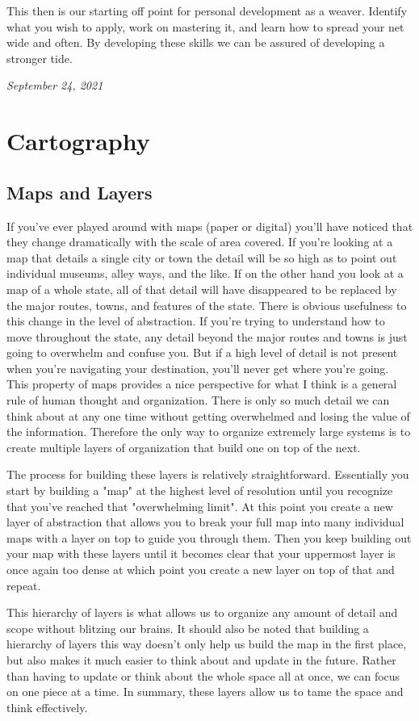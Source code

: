 \documentclass[10pt,a5paper]{book}
\begin{document}
This then is our starting off point for personal development as a weaver. Identify what you wish to apply, work on mastering it, and learn how to spread your net wide and often. By developing these skills we can be assured of developing a stronger tide. 

\textit{September 24, 2021}

\section{Cartography}
\subsection{Maps and Layers}
If you've ever played around with maps (paper or digital) you'll have noticed that they change dramatically with the scale of area covered. If you're looking at a map that details a single city or town the detail will be so high as to point out individual museums, alley ways, and the like. If on the other hand you look at a map of a whole state, all of that detail will have disappeared to be replaced by the major routes, towns, and features of the state. There is obvious usefulness to this change in the level of abstraction. If you're trying to understand how to move throughout the state, any detail beyond the major routes and towns is just going to overwhelm and confuse you. But if a high level of detail is not present when you're navigating your destination, you'll never get where you're going. This property of maps provides a nice perspective for what I think is a general rule of human thought and organization. There is only so much detail we can think about at any one time without getting overwhelmed and losing the value of the information. Therefore the only way to organize extremely large systems is to create multiple layers of organization that build one on top of the next. 

The process for building these layers is relatively straightforward. Essentially you start by building a "map" at the highest level of resolution until you recognize that you've reached that "overwhelming limit". At this point you create a new layer of abstraction that allows you to break your full map into many individual maps with a layer on top to guide you through them. Then you keep building out your map with these layers until it becomes clear that your uppermost layer is once again too dense at which point you create a new layer on top of that and repeat. 

This hierarchy of layers is what allows us to organize any amount of detail and scope without blitzing our brains. It should also be noted that building a hierarchy of layers this way doesn't only help us build the map in the first place, but also makes it much easier to think about and update in the future. Rather than having to update or think about the whole space all at once, we can focus on one piece at a time. In summary, these layers allow us to tame the space and think effectively. 
\end{document}

